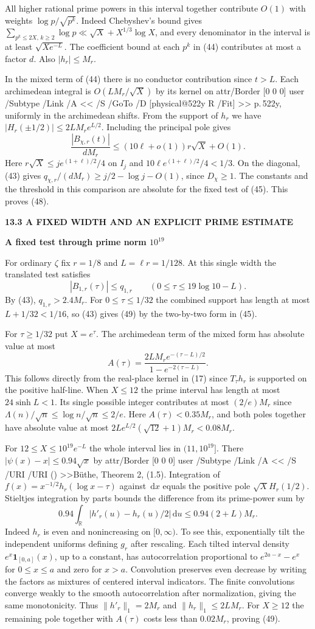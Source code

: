 \documentclass[11pt,letterpaper]{article}
\makeatletter
\newcommand{\rightmarktext}{}
\newcommand{\printfolio}{}
\newcommand{\leaf}[4]{\clearpage\gdef\printfolio{#1}\gdef\rightmarktext{#2}%
  {\small\sffamily\bfseries\color{ink}#3\par}\vspace{3pt}%
  {\LARGE\bfseries #4\par}\vspace{5pt}}
\newcommand{\R}{\mathbb R}
\newcommand{\dd}{\,\mathrm d}
\newcommand{\citetitle}[2]{\leavevmode\pdfstartlink attr{/Border [0 0 0]} user{%
 /Subtype /Link /A << /S /URI /URI (\pdfescapestring{\detokenize{#1}}) >>}{\color{ink}#2}\pdfendlink}
\newcommand{\MusicPDFPageRef}[1]{\pdfpageref\csname physical@#1\endcsname\space\space 0 R}
\newcommand{\pagelink}[2]{\leavevmode\pdfstartlink attr{/Border [0 0 0]} user{%
  /Subtype /Link /A << /S /GoTo /D [\MusicPDFPageRef{#1} /Fit] >>}%
  {\color{ink}#2}\pdfendlink}
\newcommand{\pg}[1]{\pagelink{#1}{p.\,#1}}
\makeatother
\begin{document}
All higher rational prime powers in this interval together contribute
$O(1)$ with weights $\log p/\sqrt{p^k}$. Indeed Chebyshev's bound gives
$\sum_{p^k\le 2X,\, k\ge2}\log p\ll\sqrt X+X^{1/3}\log X$, and every
denominator in the interval is at least $\sqrt{Xe^{-L}}$.
The coefficient bound at each $p^k$ in (44) contributes at most
a factor $d$. Also $|h_r|\le M_r$.

In the mixed term of (44) there is no conductor contribution
since $t>L$. Each archimedean integral is $O(LM_r/\sqrt X)$
by its kernel on \pg{522y}, uniformly in the archimedean shifts.
From the support of $h_r$ we have
$|H_r(\pm1/2)|\le 2LM_r e^{L/2}$. Including the principal pole gives
\[
 \frac{|B_{\chi,r}(t)|}{dM_r}
       \le (10\ell+o(1))r\sqrt X+O(1).
\]
Here $r\sqrt X\le j e^{(1+\ell)/2}/4$ on $I_j$ and
$10\ell e^{(1+\ell)/2}/4<1/3$. On the diagonal, (43) gives
$q_{\chi,r}/(dM_r)\ge j/2-\log j-O(1)$, since $D_\chi\ge1$.
The constants and the threshold in this comparison are absolute
for the fixed test of (45). This proves (48).

\leaf{522ac}{The rational component}{13.3 \quad A FIXED WIDTH AND AN EXPLICIT PRIME ESTIMATE}{A fixed test through prime norm \(10^{19}\)}
For ordinary $\zeta$ fix $r=1/8$ and $L=\ell r=1/128$. At this
single width the translated test satisfies
\[
       |B_{1,r}(\tau)|\le q_{1,r}
       \qquad(0\le\tau\le19\log 10-L).
 \tag{49}
\]
By (43), $q_{1,r}>2.4M_r$. For $0\le\tau\le1/32$ the combined
support has length at most $L+1/32<1/16$, so (43) gives (49)
by the two-by-two form in (45).

For $\tau\ge1/32$ put $X=e^\tau$. The archimedean term of the
mixed form has absolute value at most
\[
 A(\tau)=\frac{2L M_r e^{-(\tau-L)/2}}{1-e^{-2(\tau-L)}}.
\]
This follows directly from the real-place kernel in (17) since
$T_\tau h_r$ is supported on the positive half-line. When $X\le12$
the prime interval has length at most $24\sinh L<1$. Its single
possible integer contributes at most $(2/e)M_r$ since
$\Lambda(n)/\sqrt n\le\log n/\sqrt n\le2/e$.
Here $A(\tau)<0.35M_r$, and both poles together have absolute value
at most $2Le^{L/2}(\sqrt{12}+1)M_r<0.08M_r$.

For $12\le X\le10^{19}e^{-L}$ the whole interval lies in
$(11,10^{19}]$. There $|\psi(x)-x|\le0.94\sqrt x$ by
\citetitle{https://arxiv.org/abs/1511.02032}{B\"uthe, Theorem 2, (1.5)}.
Integration of $f(x)=x^{-1/2}h_r(\log x-\tau)$ against $\dd x$
equals the positive pole $\sqrt X H_r(1/2)$. Stieltjes integration
by parts bounds the difference from its prime-power sum by
\[
 0.94\int_{\R}|h'_r(u)-h_r(u)/2|\dd u
          \le0.94(2+L)M_r.
\]
Indeed $h_r$ is even and nonincreasing on $[0,\infty)$. To see this,
exponentially tilt the independent uniforms defining $g_r$ after
rescaling. Each tilted interval density $e^x\mathbf1_{[0,a]}(x)$,
up to a constant, has autocorrelation proportional to
$e^{2a-x}-e^x$ for $0\le x\le a$ and zero for $x>a$. Convolution
preserves even decrease by writing the factors as mixtures of
centered interval indicators. The finite convolutions converge
weakly to the smooth autocorrelation after normalization, giving
the same monotonicity. Thus $\|h'_r\|_1=2M_r$ and
$\|h_r\|_1\le2LM_r$. For $X\ge12$ the remaining pole together with
$A(\tau)$ costs less than $0.02M_r$, proving (49).
\end{document}
